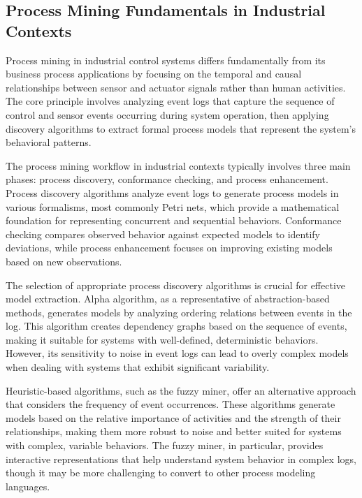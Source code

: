 \subsection{Process Mining Fundamentals in Industrial Contexts}

Process mining in industrial control systems differs fundamentally from its business process applications by focusing on the temporal and causal relationships between sensor and actuator signals rather than human activities. The core principle involves analyzing event logs that capture the sequence of control and sensor events occurring during system operation, then applying discovery algorithms to extract formal process models that represent the system's behavioral patterns.

The process mining workflow in industrial contexts typically involves three main phases: process discovery, conformance checking, and process enhancement. Process discovery algorithms analyze event logs to generate process models in various formalisms, most commonly Petri nets, which provide a mathematical foundation for representing concurrent and sequential behaviors. Conformance checking compares observed behavior against expected models to identify deviations, while process enhancement focuses on improving existing models based on new observations.



The selection of appropriate process discovery algorithms is crucial for effective model extraction. Alpha algorithm, as a representative of abstraction-based methods, generates models by analyzing ordering relations between events in the log. This algorithm creates dependency graphs based on the sequence of events, making it suitable for systems with well-defined, deterministic behaviors. However, its sensitivity to noise in event logs can lead to overly complex models when dealing with systems that exhibit significant variability.

Heuristic-based algorithms, such as the fuzzy miner, offer an alternative approach that considers the frequency of event occurrences. These algorithms generate models based on the relative importance of activities and the strength of their relationships, making them more robust to noise and better suited for systems with complex, variable behaviors. The fuzzy miner, in particular, provides interactive representations that help understand system behavior in complex logs, though it may be more challenging to convert to other process modeling languages.


